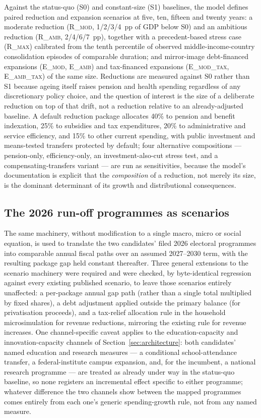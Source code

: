 \documentclass[11pt,a4paper]{article}
\begin{document}
Against the status-quo (\textsc{S0}) and constant-size (\textsc{S1}) baselines, the model defines paired reduction and expansion scenarios at five, ten, fifteen and twenty years: a moderate reduction (\textsc{R\_mod}, 1/2/3/4~pp of GDP below \textsc{S0}) and an ambitious reduction (\textsc{R\_amb}, 2/4/6/7~pp), together with a precedent-based stress case (\textsc{R\_max}) calibrated from the tenth percentile of observed middle-income-country consolidation episodes of comparable duration; and mirror-image debt-financed expansions (\textsc{E\_mod}, \textsc{E\_amb}) and tax-financed expansions (\textsc{E\_mod\_tax}, \textsc{E\_amb\_tax}) of the same size. Reductions are measured against \textsc{S0} rather than \textsc{S1} because ageing itself raises pension and health spending regardless of any discretionary policy choice, and the question of interest is the size of a deliberate reduction on top of that drift, not a reduction relative to an already-adjusted baseline. A default reduction package allocates 40\% to pension and benefit indexation, 25\% to subsidies and tax expenditures, 20\% to administrative and service efficiency, and 15\% to other current spending, with public investment and means-tested transfers protected by default; four alternative compositions --- pension-only, efficiency-only, an investment-also-cut stress test, and a compensating-transfers variant --- are run as sensitivities, because the model's documentation is explicit that the \emph{composition} of a reduction, not merely its size, is the dominant determinant of its growth and distributional consequences.

\subsection{The 2026 run-off programmes as scenarios}

The same machinery, without modification to a single macro, micro or social equation, is used to translate the two candidates' filed 2026 electoral programmes into comparable annual fiscal paths over an assumed 2027--2030 term, with the resulting package gap held constant thereafter. Three general extensions to the scenario machinery were required and were checked, by byte-identical regression against every existing published scenario, to leave those scenarios entirely unaffected: a per-package annual gap path (rather than a single total multiplied by fixed shares), a debt adjustment applied outside the primary balance (for privatisation proceeds), and a tax-relief allocation rule in the household microsimulation for revenue reductions, mirroring the existing rule for revenue increases. One channel-specific caveat applies to the education-capacity and innovation-capacity channels of Section~\ref{sec:architecture}: both candidates' named education and research measures --- a conditional school-attendance transfer, a federal-institute campus expansion, and, for the incumbent, a national research programme --- are treated as already under way in the status-quo baseline, so none registers an incremental effect specific to either programme; whatever difference the two channels show between the mapped programmes comes entirely from each one's generic spending-growth rule, not from any named measure.
\end{document}
